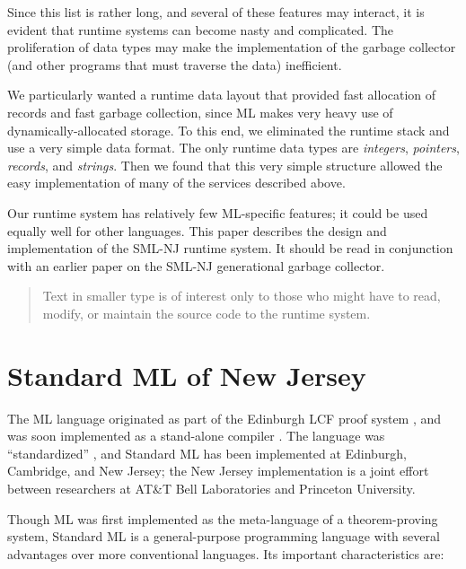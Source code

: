 Since this list is rather long, and several of these features may interact,
it is evident that runtime systems can become nasty and complicated.
The proliferation of data types may make the implementation of 
the garbage collector (and other programs that must traverse the data)
inefficient.

We particularly wanted a runtime data layout that provided fast
allocation of records and fast garbage collection, since ML makes very
heavy use of dynamically-allocated storage.  To this end, we eliminated
the runtime stack and use a very simple data format.
The only runtime data types are {\em integers}, {\em pointers},
{\em records}, and {\em strings}.
Then we found that this very simple structure allowed the easy implementation
of many of the services described above.

Our runtime system has relatively few ML-specific
features; it could be used equally well for other languages.  This paper
describes the design and implementation of the SML-NJ runtime system.
It should be read in conjunction with an earlier paper on the
SML-NJ generational garbage collector\cite{appel89:sggc}.

\begin{quotation}{
\small Text in smaller type is of interest only to those who might
have to read, modify, or maintain the source code to the runtime system.
}\end{quotation}

\section{Standard ML of New Jersey}
\label{standard}
The ML language originated as part of the Edinburgh LCF proof system
\cite{gordon78}, and was soon implemented as a stand-alone compiler
\cite{cardelli83:ml}\cite{cardelli84}.  The language was
``standardized'' \cite{milner84}\cite{macqueen84}
\cite{milner85}\cite{harper88}, and
Standard ML has been implemented at Edinburgh, Cambridge, and 
New Jersey\cite{appel87:sml}; the New Jersey implementation is
a joint effort between researchers at AT\&T Bell Laboratories and
Princeton University.

Though ML was first implemented as the meta-language of a theorem-proving
system, Standard ML is a general-purpose 
programming language with several advantages over more conventional
languages.  Its important characteristics are:

